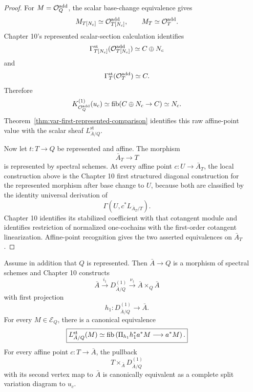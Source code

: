 \begin{proof}
For \(M=\mathcal O^{\mathrm{add}}_Q\), the scalar base-change equivalence gives
\[
    M_{T[N_c]}\simeq\mathcal O^{\mathrm{add}}_{T[N_c]},
    \qquad
    M_T\simeq\mathcal O^{\mathrm{add}}_T.
\]
Chapter 10's represented scalar-section calculation identifies
\[
    \Gamma_{T[N_c]}^{\mathrm{st}}(\mathcal O^{\mathrm{add}}_{T[N_c]})
    \simeq
    C\oplus N_c
\]
and
\[
    \Gamma_T^{\mathrm{st}}(\mathcal O^{\mathrm{add}}_T)\simeq C.
\]
Therefore
\[
    K_{\mathcal O^{\mathrm{add}}_Q}^{(1)}(u_c)
    \simeq
    \operatorname{fib}(C\oplus N_c\to C)
    \simeq
    N_c.
\]
Theorem~\ref{thm:var-first-represented-comparison} identifies this raw affine-point value with the scalar sheaf \(L^{\mathrm{st}}_{\bar A/Q}\).

Now let \(t:T\to Q\) be represented and affine. The morphism
\[
    \bar A_T\longrightarrow T
\]
is represented by spectral schemes. At every affine point \(c:U\to\bar A_T\), the local construction above is the Chapter 10 first structured diagonal construction for the represented morphism after base change to \(U\), because both are classified by the identity universal derivation of
\[
    \Gamma(U,c^*L_{\bar A_T/T}).
\]
Chapter 10 identifies its stabilized coefficient with that cotangent module and identifies restriction of normalized one-cochains with the first-order cotangent linearization. Affine-point recognition gives the two asserted equivalences on \(\bar A_T\).
\end{proof}

\begin{proposition}
\label{prop:var-universal-first-diagonal-comparison}
Assume in addition that \(Q\) is represented. Then \(\bar A\to Q\) is a morphism of spectral schemes and Chapter 10 constructs
\[
    \bar A
    \xrightarrow{i_1}
    D^{(1)}_{\bar A/Q}
    \xrightarrow{\nu_1}
    \bar A\times_Q\bar A
\]
with first projection
\[
    h_1:D^{(1)}_{\bar A/Q}\longrightarrow\bar A.
\]
For every \(M\in\mathcal E_Q\), there is a canonical equivalence
\[
    \boxed{
    L^{\mathrm{st}}_{\bar A/Q}(M)
    \simeq
    \operatorname{fib}\left(
      \Pi_{h_1}h_1^*a^*M
      \longrightarrow
      a^*M
    \right).
    }
\]
For every affine point \(c:T\to\bar A\), the pullback
\[
    T\times_{\bar A}D^{(1)}_{\bar A/Q}
\]
with its second vertex map to \(\bar A\) is canonically equivalent as a complete split variation diagram to \(u_c\).
\end{proposition}

